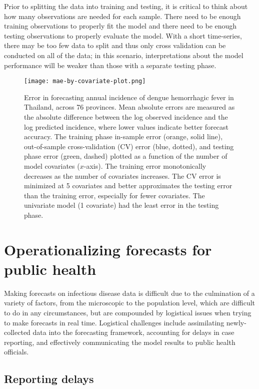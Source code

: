 \documentclass[a4paper]{article}
\begin{document}
Prior to splitting the data into training and testing, it is critical to think about how many observations are needed for each sample. 
There need to be enough training observations to properly fit the model and there need to be enough testing observations to properly evaluate the model.
With a short time-series, there may be too few data to split and thus only cross validation can be conducted on all of the data; in this scenario, interpretations about the model performance will be weaker than those with a separate testing phase.

\begin{figure}[htbp]
\begin{center}
\texttt{[image: mae-by-covariate-plot.png]}
\caption{
Error in forecasting annual incidence of dengue hemorrhagic fever in Thailand, across 76 provinces.
Mean absolute errors are measured as the absolute difference between the log observed incidence and the log predicted incidence, where lower values indicate better forecast accuracy.
The training phase in-sample error (orange, solid line), out-of-sample cross-validation (CV) error (blue, dotted), and testing phase error (green, dashed) plotted as a function of the number of model covariates ($x$-axis).
The training error monotonically decreases as the number of covariates increases.
The CV error is minimized at 5 covariates and better approximates the testing error than the training error, especially for fewer covariates.
The univariate model (1 covariate) had the least error in the testing phase.
}
\label{fig:mae}
\end{center}
\end{figure}

\section{Operationalizing forecasts for public health}

Making forecasts on infectious disease data is difficult due to the culmination of a variety of factors, from the microscopic to the population level, which are difficult to do in any circumstances, but are compounded by logistical issues when trying to make forecasts in real time.
Logistical challenges include assimilating newly-collected data into the forecasting framework, accounting for delays in case reporting, and effectively communicating the model results to public health officials.

\subsection{Reporting delays} \label{sec:delays}
\end{document}
